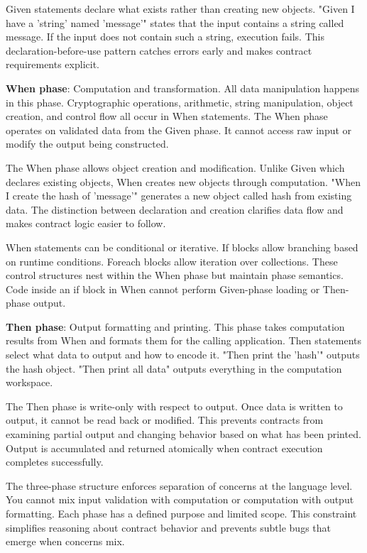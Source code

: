 Given statements declare what exists rather than creating new
objects. "Given I have a 'string' named 'message'" states that the
input contains a string called message. If the input does not contain
such a string, execution fails. This declaration-before-use pattern
catches errors early and makes contract requirements explicit.

\textbf{When phase}: Computation and transformation. All data
manipulation happens in this phase. Cryptographic operations,
arithmetic, string manipulation, object creation, and control flow all
occur in When statements. The When phase operates on validated data
from the Given phase. It cannot access raw input or modify the output
being constructed.

The When phase allows object creation and modification. Unlike Given
which declares existing objects, When creates new objects through
computation. "When I create the hash of 'message'" generates a new
object called hash from existing data. The distinction between
declaration and creation clarifies data flow and makes contract logic
easier to follow.

When statements can be conditional or iterative. If blocks allow
branching based on runtime conditions. Foreach blocks allow iteration
over collections. These control structures nest within the When phase
but maintain phase semantics. Code inside an if block in When cannot
perform Given-phase loading or Then-phase output.

\textbf{Then phase}: Output formatting and printing. This phase takes
computation results from When and formats them for the calling
application. Then statements select what data to output and how to
encode it. "Then print the 'hash'" outputs the hash object. "Then
print all data" outputs everything in the computation workspace.

The Then phase is write-only with respect to output. Once data is
written to output, it cannot be read back or modified. This prevents
contracts from examining partial output and changing behavior based on
what has been printed. Output is accumulated and returned atomically
when contract execution completes successfully.

The three-phase structure enforces separation of concerns at the
language level. You cannot mix input validation with computation or
computation with output formatting. Each phase has a defined purpose
and limited scope. This constraint simplifies reasoning about contract
behavior and prevents subtle bugs that emerge when concerns mix.

